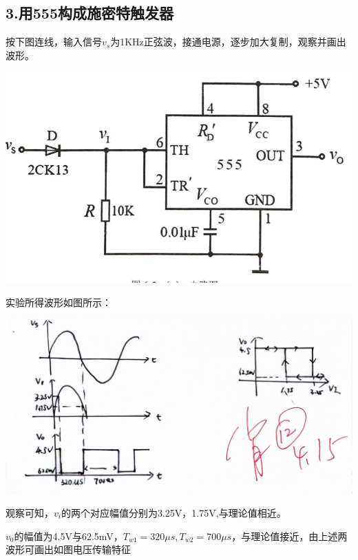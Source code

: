 \documentclass{ctexart}
\begin{document}
    \subsection*{3.用555构成施密特触发器}
    按下图连线，输入信号$v_s$为1KHz正弦波，接通电源，逐步加大复制，观察并画出波形。
    
     \begin{minipage}[c]{\textwidth}
            \centering
            \includegraphics[width=\linewidth]{3.3.1.png}
    \end{minipage}
    
    实验所得波形如图所示：
    
    \begin{minipage}[c]{\textwidth}
            \centering
            \includegraphics[width=\linewidth]{3.3.2.jpg}
    \end{minipage}

    观察可知，$v_i$的两个对应幅值分别为3.25V，1.75V,与理论值相近。

    $v_0$的幅值为4.5V与62.5mV，$T_{w1}=320\mu s,T_{w2}=700\mu s$，与理论值接近，由上述两波形可画出如图电压传输特征
\end{document}
